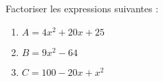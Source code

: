 
\begin{minipage}{0.99\linewidth}

\exo


Factoriser les expressions suivantes :

\begin{multicols}{3}

\begin{enumerate}

\item $ A = 4x^2+20x+25 $ 
\item $ B = 9x^2-64 $ 
\item $ C = 100 - 20x + x^2 $ 

\end{enumerate}

\end{multicols}

\end{minipage}

\vspace{0.5cm}
